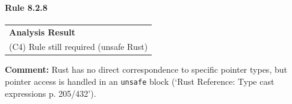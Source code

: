 \paragraph{Rule 8.2.8}
\begin{longtable}{p{13cm}}
\textbf{Analysis Result} \\
(C4) Rule still required (unsafe Rust) \\
\end{longtable}
\textbf{Comment:} Rust has no direct correspondence to specific pointer types, but pointer access is handled in an \texttt{unsafe} block (`Rust Reference: Type cast expressions p. 205/432'). \\
